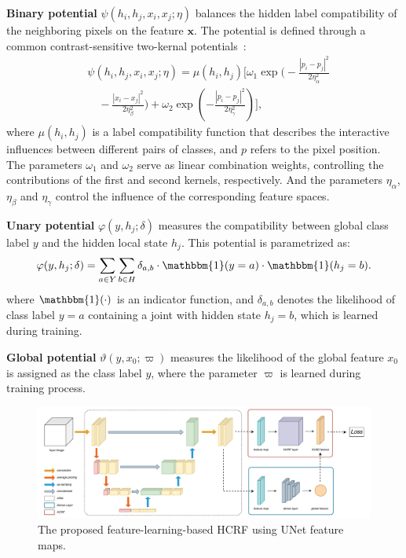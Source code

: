 \documentclass[conference]{IEEEtran}
\newcommand{\xb}{\mathbf{x}}
\newcommand{\one}{\mathbbm{1}}
\begin{document}
\textbf{Binary potential} $\psi(h_i, h_j, x_i, x_j; \eta)$ balances the
hidden label compatibility of the neighboring pixels on the feature $\xb$.
The potential is defined through a common contrast-sensitive two-kernal
potentials~\citep{krahenbuhl2011efficient, chen2022end}:
\begin{equation*}
\begin{split}
& \psi(h_i, h_j, x_i, x_j; \eta) = \mu(h_i, h_j) \Bigg[
\omega_1 \exp \bigg(
-\frac{\left\lvert p_i - p_j \right\rvert^2}{2\eta_\alpha^2} \\
&\quad
- \frac{\left\lvert x_i - x_j\right\rvert^2}{2\eta_\beta^2}
\bigg) + \omega_2 \exp \left(
- \frac{\left\lvert p_i - p_j \right\rvert^2}{2 \eta_\gamma^2}
\right)
\Bigg],
\end{split}
\end{equation*}
where $\mu(h_i, h_j)$ is a label compatibility function that describes
the interactive influences between different pairs of classes,
and $p$ refers to the pixel position.
The parameters $\omega_1$ and $\omega_2$ serve as linear combination weights,
controlling the contributions of the first and second kernels, respectively.
And the parameters $\eta_\alpha$, $\eta_\beta$ and $\eta_\gamma$ control the
influence of the corresponding feature spaces.


\textbf{Unary potential} $\varphi(y, h_j; \delta)$ measures the compatibility
between global class label $y$ and the hidden local state $h_j$.
This potential is parametrized as:
\begin{equation*}
\varphi(y, h_{j}; \delta) = \sum_{a \in Y} \sum_{b \in H} \delta_{a, b}
\cdot \one(y = a) \cdot \one(h_j = b).
\end{equation*}
where $\one(\cdot)$ is an indicator function, and $\delta_{a,b}$ denotes the
likelihood of class label $y = a$ containing a joint with hidden state
$h_j = b$, which is learned during training.


\textbf{Global potential} $\vartheta(y, x_0; \varpi)$ measures the likelihood of
the global feature $x_0$ is assigned as the class label $y$, where the parameter
$\varpi$ is learned during training process.


\begin{figure}[ht]
\centering
\includegraphics[width=\textwidth]{workframe}
\caption{The proposed feature-learning-based HCRF using UNet feature maps.}
\label{fig:workframe}
\end{figure}
\end{document}
